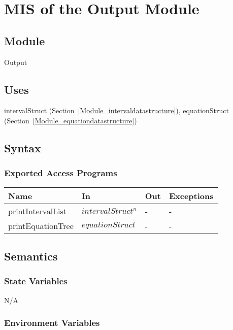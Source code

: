 \documentclass[12pt, titlepage]{article}
\begin{document}
\newpage

\section{MIS of the Output Module} 
\label{Module_output}

\subsection{Module}

Output

\subsection{Uses}

intervalStruct (Section~\ref{Module_intervaldatastructure}), equationStruct 
(Section~\ref{Module_equationdatastructure})

\subsection{Syntax}

\subsubsection{Exported Access Programs}

\begin{center}
	\begin{tabular}{p{3cm} p{3cm} p{3cm} p{5cm}}
		\hline
		\textbf{Name} & \textbf{In} & \textbf{Out} & \textbf{Exceptions} \\
		\hline
		printIntervalList & $intervalStruct^n$ & - & - \\
		printEquationTree & $equationStruct$ & - & - \\
		\hline
	\end{tabular}
\end{center}

\subsection{Semantics}

\subsubsection{State Variables}

N/A

\subsubsection{Environment Variables}
\end{document}
